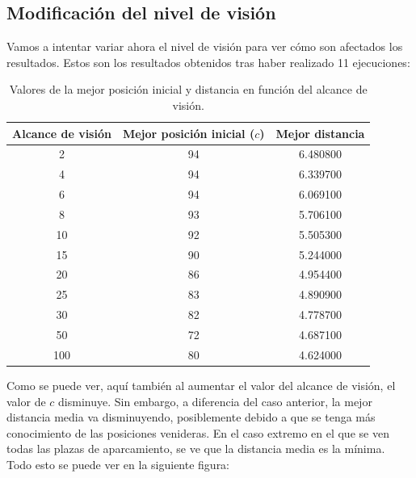 \documentclass[11pt,a4paper]{report}
\begin{document}
\subsection{Modificación del nivel de visión}

Vamos a intentar variar ahora el nivel de visión para ver cómo son afectados los resultados. Estos son los resultados
obtenidos tras haber realizado 11 ejecuciones:

\begin{table}[H]
\begin{tabular}{c|c|c}
\textbf{Alcance de visión} & \textbf{Mejor posición inicial ($c$)} & \textbf{Mejor distancia} \\ \hline
2                          & 94                              & 6.480800                 \\
4                          & 94                              & 6.339700                 \\
6                          & 94                              & 6.069100                 \\
8                          & 93                              & 5.706100                 \\
10                         & 92                              & 5.505300                 \\
15                         & 90                              & 5.244000                 \\
20                         & 86                              & 4.954400                 \\
25                         & 83                              & 4.890900                 \\
30                         & 82                              & 4.778700                 \\
50                         & 72                              & 4.687100                 \\
100                        & 80                              & 4.624000                
\end{tabular}
\caption{Valores de la mejor posición inicial y distancia en función del alcance de visión.}
\label{aparc-tabla-vis}
\end{table}

Como se puede ver, aquí también al aumentar el valor del alcance de visión, el valor de $c$ disminuye. Sin embargo,
a diferencia del caso anterior, la mejor distancia media va disminuyendo, posiblemente debido a que se tenga más
conocimiento de las posiciones venideras. En el caso extremo en el que se ven todas las plazas de aparcamiento,
se ve que la distancia media es la mínima. Todo esto se puede ver en la siguiente figura:
\end{document}
